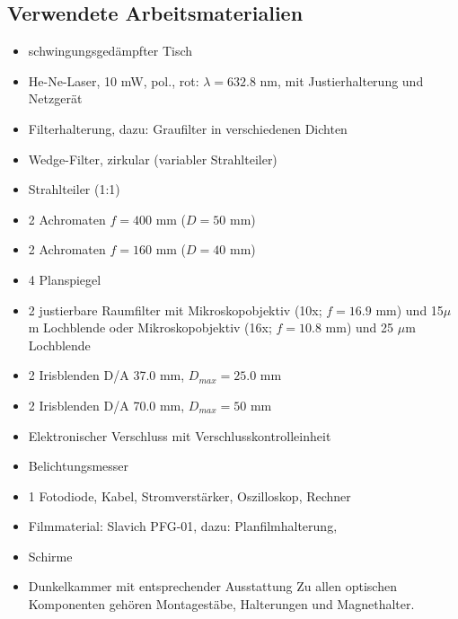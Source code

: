 \subsection{Verwendete Arbeitsmaterialien}
\begin{itemize}
\item schwingungsgedämpfter Tisch 
\item He-Ne-Laser, 10 mW, pol., rot: $\lambda = 632.8$ nm, mit Justierhalterung und Netzgerät 
\item Filterhalterung, dazu: Graufilter in verschiedenen Dichten 
\item Wedge-Filter, zirkular (variabler Strahlteiler) 
\item Strahlteiler (1:1) 
\item 2 Achromaten $f = 400$ mm ($D = 50$ mm) 
\item 2 Achromaten $f = 160$ mm ($D = 40$ mm) 
\item 4 Planspiegel 
\item 2 justierbare Raumfilter mit Mikroskopobjektiv (10x; $f = 16.9$ mm) und 15$\mu$m Lochblende oder Mikroskopobjektiv (16x; $f = 10.8$ mm) und 25 $\mu$m Lochblende 
\item 2 Irisblenden D/A 37.0 mm, $D_{max} = 25.0$ mm 
\item 2 Irisblenden D/A 70.0 mm, $D_{max} = 50$ mm 
\item Elektronischer Verschluss mit Verschlusskontrolleinheit 
\item Belichtungsmesser 
\item 1 Fotodiode, Kabel, Stromverstärker, Oszilloskop, Rechner 
\item Filmmaterial: Slavich PFG-01, dazu: Planfilmhalterung, 
\item Schirme 
\item Dunkelkammer mit entsprechender Ausstattung 
Zu allen optischen Komponenten gehören Montagestäbe, Halterungen und Magnethalter. 
\end{itemize}